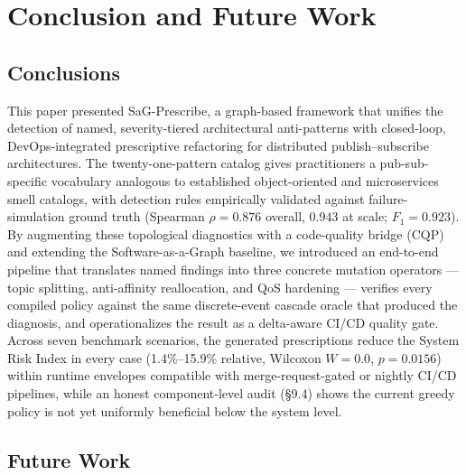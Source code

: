 \documentclass[11pt]{article}
\begin{document}
\section{Conclusion and Future Work}

\subsection{Conclusions}

This paper presented SaG-Prescribe, a graph-based framework that unifies the detection of named,
severity-tiered architectural anti-patterns with closed-loop, DevOps-integrated prescriptive
refactoring for distributed publish--subscribe architectures. The twenty-one-pattern catalog gives
practitioners a pub-sub-specific vocabulary analogous to established object-oriented and microservices
smell catalogs, with detection rules empirically validated against failure-simulation ground truth
(Spearman $\rho = 0.876$ overall, $0.943$ at scale; $F_1 = 0.923$). By augmenting these topological
diagnostics with a code-quality bridge (CQP) and extending the Software-as-a-Graph baseline, we
introduced an end-to-end pipeline that translates named findings into three concrete mutation operators
--- topic splitting, anti-affinity reallocation, and QoS hardening --- verifies every compiled policy
against the same discrete-event cascade oracle that produced the diagnosis, and operationalizes the
result as a delta-aware CI/CD quality gate. Across seven benchmark scenarios, the generated
prescriptions reduce the System Risk Index in every case (1.4\%--15.9\% relative, Wilcoxon $W=0.0$,
$p=0.0156$) within runtime envelopes compatible with merge-request-gated or nightly CI/CD pipelines,
while an honest component-level audit (\S9.4) shows the current greedy policy is not yet uniformly
beneficial below the system level.

\subsection{Future Work}
\end{document}

